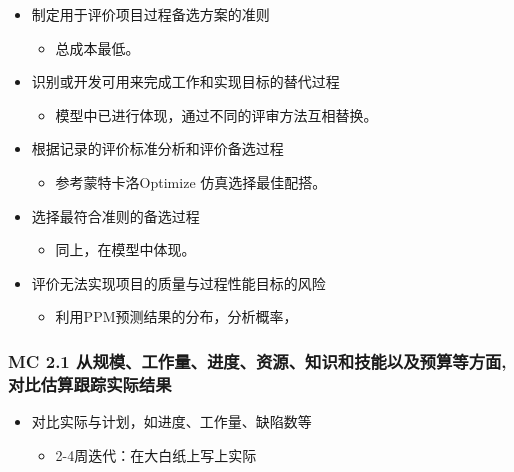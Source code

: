 \begin{itemize}
\tightlist
\item
  制定用于评价项目过程备选方案的准则

  \begin{itemize}
  \tightlist
  \item
    总成本最低。
  \end{itemize}
\item
  识别或开发可用来完成工作和实现目标的替代过程

  \begin{itemize}
  \tightlist
  \item
    模型中已进行体现，通过不同的评审方法互相替换。
  \end{itemize}
\item
  根据记录的评价标准分析和评价备选过程

  \begin{itemize}
  \tightlist
  \item
    参考蒙特卡洛Optimize 仿真选择最佳配搭。
  \end{itemize}
\item
  选择最符合准则的备选过程

  \begin{itemize}
  \tightlist
  \item
    同上，在模型中体现。
  \end{itemize}
\item
  评价无法实现项目的质量与过程性能目标的风险

  \begin{itemize}
  \tightlist
  \item
    利用PPM预测结果的分布，分析概率，
  \end{itemize}
\end{itemize}

\hypertarget{mc-2.1-ux4eceux89c4ux6a21ux5de5ux4f5cux91cfux8fdbux5ea6ux8d44ux6e90ux77e5ux8bc6ux548cux6280ux80fdux4ee5ux53caux9884ux7b97ux7b49ux65b9ux9762ux5bf9ux6bd4ux4f30ux7b97ux8ddfux8e2aux5b9eux9645ux7ed3ux679c}{%
\subsubsection{MC 2.1
从规模、工作量、进度、资源、知识和技能以及预算等方面,对比估算跟踪实际结果}\label{mc-2.1-ux4eceux89c4ux6a21ux5de5ux4f5cux91cfux8fdbux5ea6ux8d44ux6e90ux77e5ux8bc6ux548cux6280ux80fdux4ee5ux53caux9884ux7b97ux7b49ux65b9ux9762ux5bf9ux6bd4ux4f30ux7b97ux8ddfux8e2aux5b9eux9645ux7ed3ux679c}}

\begin{itemize}
\tightlist
\item
  对比实际与计划，如进度、工作量、缺陷数等

  \begin{itemize}
  \tightlist
  \item
    2-4周迭代：在大白纸上写上实际
  \end{itemize}
\end{itemize}

